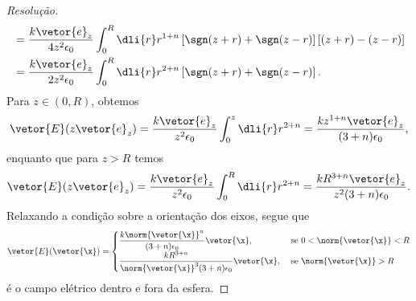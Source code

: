 \begin{proof}[Resolução]
\begin{align*}
                                &= \frac{k \vetor{e}_z}{4z^2 \epsilon_0} \int_0^R \dli{r} r^{1+n}\left[\sgn(z+r) + \sgn(z-r)\right]\left[(z + r) - (z - r)\right]\\
                                &= \frac{k \vetor{e}_z}{2z^2 \epsilon_0} \int_0^R \dli{r} r^{2+n}\left[\sgn(z+r) + \sgn(z-r)\right].
    \end{align*}
    Para \(z \in (0, R)\), obtemos
    \begin{align*}
        \vetor{E}(z\vetor{e}_z) = \frac{k \vetor{e}_z}{z^2 \epsilon_0} \int_0^z \dli{r} r^{2+n} = \frac{kz^{1+n} \vetor{e}_z}{(3+n) \epsilon_0},
    \end{align*}
    enquanto que para \(z > R\) temos
    \begin{align*}
        \vetor{E}(z\vetor{e}_z) = \frac{k \vetor{e}_z}{z^2 \epsilon_0} \int_0^R \dli{r} r^{2+n} = \frac{k R^{3+n}\vetor{e}_z}{z^2(3+n) \epsilon_0}.
    \end{align*}
    Relaxando a condição sobre a orientação dos eixos, segue que
    \begin{equation*}
        \vetor{E}(\vetor{\x}) = \begin{cases}
            \dfrac{k\norm{\vetor{\x}}^{n}}{(3+n)\epsilon_0}\vetor{\x}, &\text{ se }0 < \norm{\vetor{\x}} < R\\
            \dfrac{kR^{3+n}}{\norm{\vetor{\x}}^3(3+n)\epsilon_0}\vetor{\x}, &\text{ se }\norm{\vetor{\x}} > R\\
        \end{cases}
    \end{equation*}
    é o campo elétrico dentro e fora da esfera.
\end{proof}
